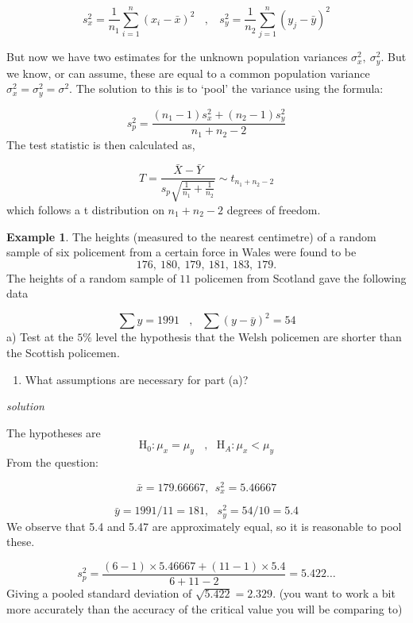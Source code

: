\documentclass[
]{book}
\providecommand{\tightlist}{%
  \setlength{\itemsep}{0pt}\setlength{\parskip}{0pt}}
\theoremstyle{definition}
\theoremstyle{definition}
\newtheorem{example}{Example}[chapter]
\theoremstyle{definition}
\theoremstyle{definition}
\theoremstyle{remark}
\begin{document}
\[s_x^2 = \frac{1}{n_1}\sum_{i=1}^n(x_i-\bar{x})^2 \ \ \ \ , \ \ \ \ s_y^2 = \frac{1}{n_2}\sum_{j=1}^n(y_j-\bar{y})^2 \]

But now we have two estimates for the unknown population variances \(\sigma_x^2, \ \sigma_y^2\). But we know, or can assume, these are equal to a common population variance \(\sigma_x^2=\sigma_y^2=\sigma^2\). The solution to this is to `pool' the variance using the formula:

\[s_p^2  = \frac{(n_1-1)s_x^2+(n_2-1)s_y^2}{n_1+n_2-2}\]
The test statistic is then calculated as,

\[T = \frac{\bar{X}-\bar{Y}}{s_p\sqrt{\frac{1}{n_1}+\frac{1}{n_2}}} \sim t_{n_1+n_2-2} \]
which follows a t distribution on \(n_1+n_2-2\) degrees of freedom.

\begin{example}

The heights (measured to the nearest centimetre) of a random sample of six policement from a certain force in Wales were found to be
\[176, \ 180, \ 179, \ 181, \ 183, \ 179.\]
The heights of a random sample of \(11\) policemen from Scotland gave the following data

\[\sum y =1991  \ \ \ \ , \ \ \ \sum(y-\bar{y})^2 = 54\]
a) Test at the \(5\%\) level the hypothesis that the Welsh policemen are shorter than the Scottish policemen.

\begin{enumerate}
\def\labelenumi{\alph{enumi})}
\setcounter{enumi}{1}
\tightlist
\item
  What assumptions are necessary for part (a)?
\end{enumerate}

\end{example}

\emph{solution}

The hypotheses are
\[\text{H}_0: \mu_{x} = \mu_{y} \ \ \ \ , \ \ \ \text{H}_A: \mu_{x}< \mu_{y}\]
From the question:

\[\bar{x}=179.66667, \ \ s^2_x =5.46667 \]

\[\bar{y}= 1991/11 = 181, \ \ \ s^2_y = 54/10 = 5.4 \]
We observe that 5.4 and 5.47 are approximately equal, so it is reasonable to pool these.

\[s^2_p = \frac{(6-1)\times5.46667 +(11-1)\times5.4 }{6+11-2} =5.422\ldots\]
Giving a pooled standard deviation of \(\sqrt{5.422} = 2.329\).
(you want to work a bit more accurately than the accuracy of the critical value you will be comparing to)
\end{document}
